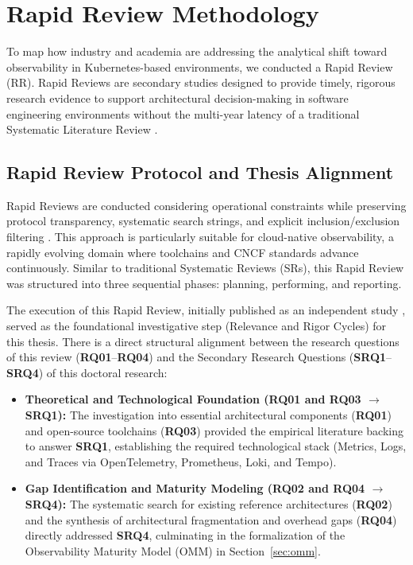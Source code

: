 \section{Rapid Review Methodology}
\label{sec:rapid-review}

To map how industry and academia are addressing the analytical shift toward observability in Kubernetes-based environments, we conducted a Rapid Review (RR). Rapid Reviews are secondary studies designed to provide timely, rigorous research evidence to support architectural decision-making in software engineering environments without the multi-year latency of a traditional Systematic Literature Review \cite{cartaxo_2018}.

\subsection{Rapid Review Protocol and Thesis Alignment}

Rapid Reviews are conducted considering operational constraints while preserving protocol transparency, systematic search strings, and explicit inclusion/exclusion filtering \cite{cartaxo_2018}. This approach is particularly suitable for cloud-native observability, a rapidly evolving domain where toolchains and CNCF standards advance continuously. Similar to traditional Systematic Reviews (SRs), this Rapid Review was structured into three sequential phases: planning, performing, and reporting.

The execution of this Rapid Review, initially published as an independent study \cite{silva_2026}, served as the foundational investigative step (Relevance and Rigor Cycles) for this thesis. There is a direct structural alignment between the research questions of this review (\textbf{RQ01}--\textbf{RQ04}) and the Secondary Research Questions (\textbf{SRQ1}--\textbf{SRQ4}) of this doctoral research:

\begin{itemize}
    \item \textbf{Theoretical and Technological Foundation (RQ01 and RQ03 $\rightarrow$ SRQ1):} The investigation into essential architectural components (\textbf{RQ01}) and open-source toolchains (\textbf{RQ03}) provided the empirical literature backing to answer \textbf{SRQ1}, establishing the required technological stack (Metrics, Logs, and Traces via OpenTelemetry, Prometheus, Loki, and Tempo).
    \item \textbf{Gap Identification and Maturity Modeling (RQ02 and RQ04 $\rightarrow$ SRQ4):} The systematic search for existing reference architectures (\textbf{RQ02}) and the synthesis of architectural fragmentation and overhead gaps (\textbf{RQ04}) directly addressed \textbf{SRQ4}, culminating in the formalization of the Observability Maturity Model (OMM) in Section~\ref{sec:omm}.
\end{itemize}

